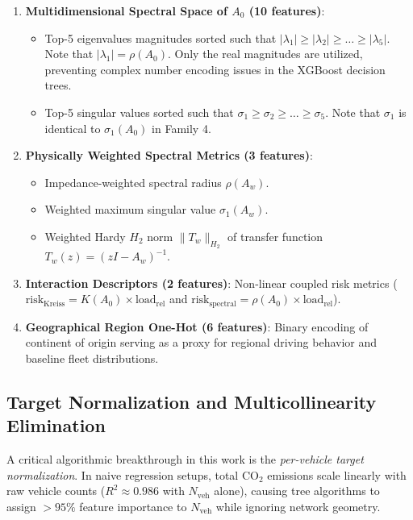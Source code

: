 \documentclass[lettersize,journal]{IEEEtran}
\begin{document}
\begin{enumerate}
\begin{itemize}
        \item Commutator non-normality $\Delta(A_0) = \|A_0 A_0^T - A_0^T A_0\|_F$.
    \end{itemize}
    \item \textbf{Multidimensional Spectral Space of $A_0$ (10 features)}: 
    \begin{itemize}
        \item Top-5 eigenvalues magnitudes sorted such that $|\lambda_1| \ge |\lambda_2| \ge \dots \ge |\lambda_5|$. Note that $|\lambda_1| = \rho(A_0)$. Only the real magnitudes are utilized, preventing complex number encoding issues in the XGBoost decision trees.
        \item Top-5 singular values sorted such that $\sigma_1 \ge \sigma_2 \ge \dots \ge \sigma_5$. Note that $\sigma_1$ is identical to $\sigma_1(A_0)$ in Family 4.
    \end{itemize}
    \item \textbf{Physically Weighted Spectral Metrics (3 features)}:
    \begin{itemize}
        \item Impedance-weighted spectral radius $\rho(A_w)$.
        \item Weighted maximum singular value $\sigma_1(A_w)$.
        \item Weighted Hardy $H_2$ norm $\|T_w\|_{H_2}$ of transfer function $T_w(z) = (zI - A_w)^{-1}$.
    \end{itemize}
    \item \textbf{Interaction Descriptors (2 features)}: Non-linear coupled risk metrics ($\text{risk}_{\text{Kreiss}} = K(A_0) \times \text{load}_{\text{rel}}$ and $\text{risk}_{\text{spectral}} = \rho(A_0) \times \text{load}_{\text{rel}}$).
    \item \textbf{Geographical Region One-Hot (6 features)}: Binary encoding of continent of origin serving as a proxy for regional driving behavior and baseline fleet distributions.
\end{enumerate}

\subsection{Target Normalization and Multicollinearity Elimination}
A critical algorithmic breakthrough in this work is the \emph{per-vehicle target normalization}. In naive regression setups, total $\text{CO}_2$ emissions scale linearly with raw vehicle counts ($R^2 \approx 0.986$ with $N_{\text{veh}}$ alone), causing tree algorithms to assign $>95\%$ feature importance to $N_{\text{veh}}$ while ignoring network geometry.
\end{document}
